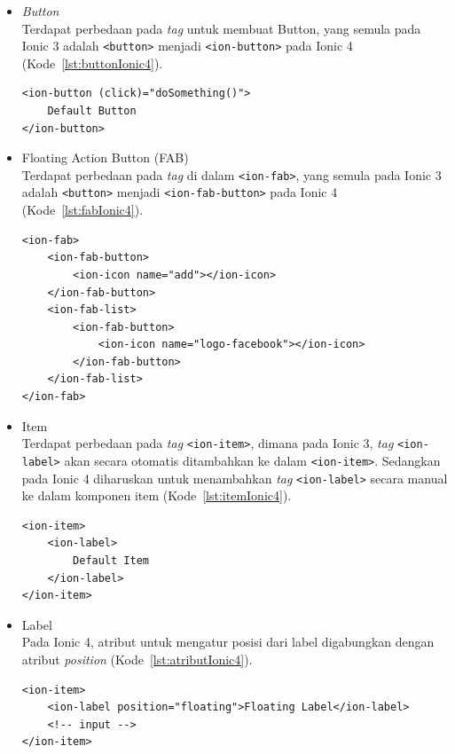 \begin{enumerate}
\begin{enumerate}
\begin{itemize}
			\begin{itemize}
				\item {\it Button} \\
				Terdapat perbedaan pada {\it tag} untuk membuat Button, yang semula pada Ionic 3 adalah \texttt{<button>} menjadi \texttt{<ion-button>} pada Ionic 4 (Kode~\ref{lst:buttonIonic4}).
\begin{lstlisting}[label={lst:buttonIonic4}, caption=Penggunaan Button pada Ionic 4]
<ion-button (click)="doSomething()">
	Default Button
</ion-button>
\end{lstlisting}

				\item Floating Action Button (FAB) \\
				Terdapat perbedaan pada {\it tag} di dalam \texttt{<ion-fab>}, yang semula pada Ionic 3 adalah \texttt{<button>} menjadi \texttt{<ion-fab-button>} pada Ionic 4 (Kode~\ref{lst:fabIonic4}).

\begin{lstlisting}[label={lst:fabIonic4}, caption=Penggunaan Floating Action Button pada Ionic 4]
<ion-fab>
	<ion-fab-button>
		<ion-icon name="add"></ion-icon>
	</ion-fab-button>
	<ion-fab-list>
		<ion-fab-button>
			<ion-icon name="logo-facebook"></ion-icon>
		</ion-fab-button>
	</ion-fab-list>
</ion-fab>
\end{lstlisting}
				
				\item Item \\
				Terdapat perbedaan pada \textit{tag} \texttt{<ion-item>}, dimana pada Ionic 3, \textit{tag} \texttt{<ion-label>} akan secara otomatis ditambahkan ke dalam \texttt{<ion-item>}. Sedangkan pada Ionic 4 diharuskan untuk menambahkan \textit{tag} \texttt{<ion-label>} secara manual ke dalam komponen item (Kode~\ref{lst:itemIonic4}). 
				
\begin{lstlisting}[label={lst:itemIonic4}, caption=Penggunaan Item pada Ionic 4]
<ion-item>
	<ion-label>
    	Default Item
	</ion-label>
</ion-item>
\end{lstlisting}

				\item Label \\
				Pada Ionic 4, atribut untuk mengatur posisi dari label digabungkan dengan atribut {\it position} (Kode~\ref{lst:atributIonic4}).
\begin{lstlisting}[label={lst:atributIonic4}, caption=Penggunaan Atribut {\it Position} pada Ionic 4]
<ion-item>
	<ion-label position="floating">Floating Label</ion-label>
	<!-- input -->
</ion-item>
\end{lstlisting}


\end{itemize}
\end{itemize}
\end{enumerate}
\end{enumerate}
